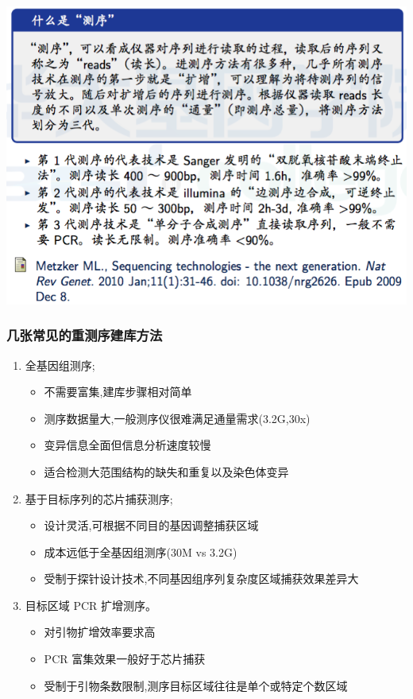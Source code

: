 \documentclass[12pt]{beamer}
\begin{document}
\begin{frame}
  \includegraphics[width=\textwidth]{figures/old_slides/seq.png}
\end{frame}

\begin{frame}\frametitle{几张常见的重测序建库方法}
  \begin{enumerate}
  \item 全基因组测序;
    \begin{itemize}
    \item 不需要富集,建库步骤相对简单
    \item 测序数据量大,一般测序仪很难满足通量需求(3.2G,30x)
    \item 变异信息全面但信息分析速度较慢
    \item 适合检测大范围结构的缺失和重复以及染色体变异
    \end{itemize}
    
  \item 基于目标序列的芯片捕获测序;
    \begin{itemize}
    \item 设计灵活,可根据不同目的基因调整捕获区域
    \item 成本远低于全基因组测序(30M vs 3.2G)
    \item 受制于探针设计技术,不同基因组序列复杂度区域捕获效果差异大
    \end{itemize}
  \item 目标区域 PCR 扩增测序。
    \begin{itemize}
    \item 对引物扩增效率要求高
    \item PCR 富集效果一般好于芯片捕获
    \item 受制于引物条数限制,测序目标区域往往是单个或特定个数区域
    \end{itemize}
  \end{enumerate}
\end{frame}
\end{document}
